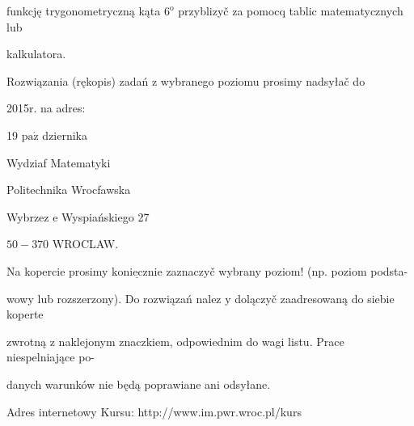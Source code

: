 \documentclass[a4paper,12pt]{article}
\begin{document}
funkcję trygonometryczną kąta $6^{\mathrm{o}}$ przyblizyč za pomocq tablic matematycznych lub

kalkulatora.

Rozwiązania (rękopis) zadań z wybranego poziomu prosimy nadsyłač do

2015r. na adres:

19 $\mathrm{p}\mathrm{a}\acute{\mathrm{z}}$ dziernika

Wydziaf Matematyki

Politechnika Wrocfawska

Wybrzez $\mathrm{e}$ Wyspiańskiego 27

$50-370$ WROCLAW.

Na kopercie prosimy $\underline{\mathrm{k}\mathrm{o}\mathrm{n}\mathrm{i}\mathrm{e}\mathrm{c}\mathrm{z}\mathrm{n}\mathrm{i}\mathrm{e}}$ zaznaczyč wybrany poziom! (np. poziom podsta-

wowy lub rozszerzony). Do rozwiązań nalez $\mathrm{y}$ dolączyč zaadresowaną do siebie koperte

zwrotną $\mathrm{z}$ naklejonym znaczkiem, odpowiednim do wagi listu. Prace niespelniające po-

danych warunków nie będą poprawiane ani odsyłane.

Adres internetowy Kursu: http://www.im.pwr.wroc.pl/kurs
\end{document}
